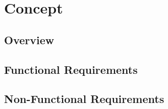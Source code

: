 
\chapter{Concept}
\label{chp:concept}

\section{Overview}

\section{Functional Requirements}

\section{Non-Functional Requirements}
